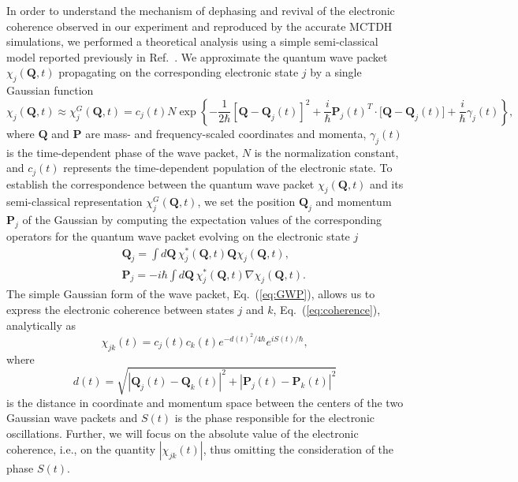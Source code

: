 \documentclass[12pt]{article}
\begin{document}
In order to understand the mechanism of dephasing and revival of the electronic coherence observed in our experiment and reproduced by the accurate MCTDH simulations, we performed a theoretical analysis using a simple semi-classical model reported previously in Ref.~\cite{golubev2020tga}. We approximate the quantum wave packet $\chi_{j}(\mathbf{Q},t)$ propagating on the corresponding electronic state $j$ by a single Gaussian function
%
\begin{equation}
\label{eq:GWP}
\chi_{j}(\mathbf{Q},t) \approx \chi^G_{j}(\mathbf{Q},t) = 
    c_j(t) N \exp\left\{
        -\frac{1}{2\hbar}[\mathbf{Q}-\mathbf{Q}_{j}(t)]^{2}
        +\frac{i}{\hbar}\mathbf{P}_{j}(t)^{T}\cdot\lbrack\mathbf{Q}-\mathbf{Q}_{j}(t)]
        +\frac{i}{\hbar}\gamma_{j}(t)
    \right\},
\end{equation}
%
where $\mathbf{Q}$ and $\mathbf{P}$ are mass- and frequency-scaled coordinates and momenta, $\gamma_{j}(t)$ is the time-dependent phase of the wave packet, $N$ is the normalization constant, and $c_j(t)$ represents the time-dependent population of the electronic state. To establish the correspondence between the quantum wave packet $\chi_{j}(\mathbf{Q},t)$ and its semi-classical representation $\chi^G_{j}(\mathbf{Q},t)$, we set the position $\mathbf{Q}_j$ and momentum $\mathbf{P}_j$ of the Gaussian by computing the expectation values of the corresponding operators for the quantum wave packet evolving on the electronic state $j$
%
\begin{eqnarray*}
    &&\mathbf{Q}_j = \int d \mathbf{Q}\, \chi^*_{j}(\mathbf{Q},t) \mathbf{Q} \chi_{j}(\mathbf{Q},t),\\
    &&\mathbf{P}_j = -i \hbar \int d \mathbf{Q}\, \chi^*_{j}(\mathbf{Q},t) \nabla \chi_{j}(\mathbf{Q},t).
\end{eqnarray*}
%
The simple Gaussian form of the wave packet, Eq.~(\ref{eq:GWP}), allows us to express the electronic coherence between states $j$ and $k$, Eq.~(\ref{eq:coherence}), analytically as
%
\begin{equation}
\label{eq:SC_coh}
    \chi_{jk}(t)=c_j(t) c_k(t) e^{-d(t)^{2}/4\hbar}e^{iS(t)/\hbar},
\end{equation}
%
where
%
\begin{equation}
\label{eq:ph_dist}
    d(t)=\sqrt{|\mathbf{Q}_{j}(t)-\mathbf{Q}_{k}(t)|^{2}+|\mathbf{P}_{j}(t)-\mathbf{P}_{k}(t)|^{2}}
\end{equation}
%
is the distance in coordinate and momentum space between the centers of the two Gaussian wave packets and $S(t)$ is the phase responsible for the electronic oscillations. Further, we will focus on the absolute value of the electronic coherence, i.e., on the quantity $|\chi_{jk}(t)|$, thus omitting the consideration of the phase $S(t)$.
\end{document}
